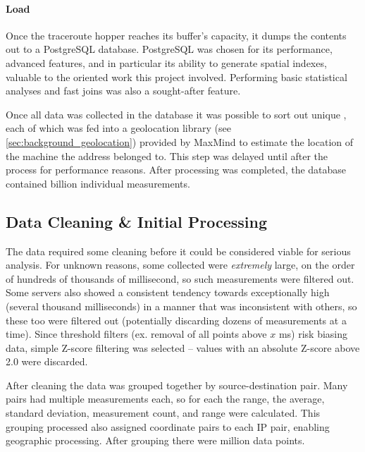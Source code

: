 \paragraph{Load} Once the traceroute hopper reaches its buffer's capacity, it dumps the contents out to a PostgreSQL database. PostgreSQL was chosen for its performance, advanced features, and in particular its ability to generate spatial indexes, valuable to the \gis oriented work this project involved. Performing basic statistical analyses and fast joins was also a sought-after feature.

\bigskip

Once all data was collected in the database it was possible to sort out unique \ips, each of which was fed into a geolocation library (see \cref{sec:background_geolocation}) provided by MaxMind to estimate the location of the machine the \ip address belonged to. This step was delayed until after the \etl process for performance reasons. After processing was completed, the database contained  billion individual \rtt measurements.

\subsection{Data Cleaning \& Initial Processing}

The data required some cleaning before it could be considered viable for serious analysis. For unknown reasons, some collected \rtts were \textit{extremely} large, on the order of hundreds of thousands of millisecond, so such measurements were filtered out. Some servers also showed a consistent tendency towards exceptionally high \rtts (several thousand milliseconds) in a manner that was inconsistent with others, so these too were filtered out (potentially discarding dozens of measurements at a time). Since threshold filters (ex. removal of all points above $x$ ms) risk biasing data, simple Z-score filtering was selected -- values with an absolute Z-score above 2.0 were discarded.

After cleaning the data was grouped together by source-destination \ip pair. Many pairs had multiple measurements each, so for each the range, the average, standard deviation, measurement count, and range were calculated. This grouping processed also assigned coordinate pairs to each IP pair, enabling geographic processing. After grouping there were  million data points.
